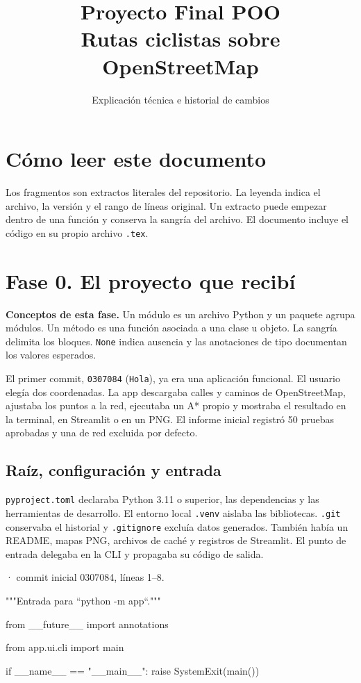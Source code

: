 \documentclass[11pt,a4paper]{article}
\title{Proyecto Final POO\\Rutas ciclistas sobre OpenStreetMap}
\author{Explicación técnica e historial de cambios}
\date{}
\begin{document}
\maketitle
\tableofcontents
\clearpage

\section*{Cómo leer este documento}
Los fragmentos son extractos literales del repositorio. La leyenda indica
el archivo, la versión y el rango de líneas original. Un extracto puede
empezar dentro de una función y conserva la sangría del archivo. El documento
incluye el código en su propio archivo \texttt{.tex}.

\section{Fase 0. El proyecto que recibí}

\textbf{Conceptos de esta fase.} Un módulo es un archivo Python y un paquete agrupa módulos. Un método es una función asociada a una clase u objeto. La sangría delimita los bloques. \texttt{None} indica ausencia y las anotaciones de tipo documentan los valores esperados.

El primer commit, \texttt{0307084} (\texttt{Hola}), ya era una aplicación funcional. El usuario elegía dos coordenadas. La app descargaba calles y caminos de OpenStreetMap, ajustaba los puntos a la red, ejecutaba un A* propio y mostraba el resultado en la terminal, en Streamlit o en un PNG. El informe inicial registró 50 pruebas aprobadas y una de red excluida por defecto.

\subsection{Raíz, configuración y entrada}
\texttt{pyproject.toml} declaraba Python 3.11 o superior, las dependencias y las herramientas de desarrollo. El entorno local \texttt{.venv} aislaba las bibliotecas. \texttt{.git} conservaba el historial y \texttt{.gitignore} excluía datos generados. También había un README, mapas PNG, archivos de caché y registros de Streamlit. El punto de entrada delegaba en la CLI y propagaba su código de salida.

\smallskip
{\footnotesize\texttt{} · commit inicial 0307084, líneas 1--8.}\par
\begin{Codigo}[firstnumber=1]
"""Entrada para ``python -m app``."""

from __future__ import annotations

from app.ui.cli import main

if __name__ == "__main__":
    raise SystemExit(main())
\end{Codigo}
\end{document}
